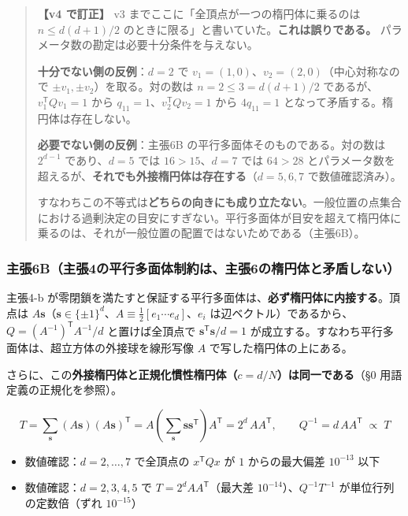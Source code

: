 \documentclass[
  10pt,
]{ltjsarticle}
\providecommand{\tightlist}{%
  \setlength{\itemsep}{0pt}\setlength{\parskip}{0pt}}
\begin{document}
\begin{quote}
\textbf{【v4 で訂正】} v3 までここに「全頂点が一つの楕円体に乗るのは
\(n \le d(d+1)/2\)
のときに限る」と書いていた。\textbf{これは誤りである。}
パラメータ数の勘定は必要十分条件を与えない。

\textbf{十分でない側の反例}：\(d=2\) で
\(v_1=(1,0)\)、\(v_2=(2,0)\)（中心対称なので
\(\pm v_1, \pm v_2\)）を取る。対の数は \(n=2 \le 3 = d(d+1)/2\)
であるが、\(v_1^{\mathsf T}Qv_1 = 1\) から
\(q_{11}=1\)、\(v_2^{\mathsf T}Qv_2 = 1\) から \(4q_{11}=1\)
となって矛盾する。楕円体は存在しない。

\textbf{必要でない側の反例}：主張6B の平行多面体そのものである。対の数は
\(2^{d-1}\) であり、\(d=5\) では \(16 > 15\)、\(d=7\) では \(64 > 28\)
とパラメータ数を超えるが、\textbf{それでも外接楕円体は存在する}（\(d=5,6,7\)
で数値確認済み）。

すなわちこの不等式は\textbf{どちらの向きにも成り立たない}。一般位置の点集合における過剰決定の目安にすぎない。平行多面体が目安を超えて楕円体に乗るのは、それが一般位置の配置ではないためである（主張6B）。
\end{quote}

\subsubsection{主張6B（主張4の平行多面体制約は、主張6の楕円体と矛盾しない）}\label{ux4e3bux5f356bux4e3bux5f354ux306eux5e73ux884cux591aux9762ux4f53ux5236ux7d04ux306fux4e3bux5f356ux306eux6955ux5186ux4f53ux3068ux77dbux76feux3057ux306aux3044}

主張4-b
が零閉鎖を満たすと保証する平行多面体は、\textbf{必ず楕円体に内接する}。頂点は
\(A\mathbf{s}\)（\(\mathbf{s}\in\{\pm1\}^d\)、\textbf{\(A \equiv \tfrac12[e_1\cdots e_d]\)}、\(e_i\)
は辺ベクトル）であるから、\(Q = (A^{-1})^{\mathsf T}A^{-1}/d\)
と置けば全頂点で \(\mathbf{s}^{\mathsf T}\mathbf{s}/d = 1\)
が成立する。すなわち平行多面体は、超立方体の外接球を線形写像 \(A\)
で写した楕円体の上にある。

さらに、この\textbf{外接楕円体と正規化慣性楕円体（\(c = d/N\)）は同一である}（§0
用語定義の正規化を参照）。

\[T = \sum_{\mathbf{s}} (A\mathbf{s})(A\mathbf{s})^{\mathsf T} = A\left(\sum_{\mathbf{s}}\mathbf{s}\mathbf{s}^{\mathsf T}\right)A^{\mathsf T} = 2^{d}\,AA^{\mathsf T}, \qquad Q^{-1} = d\,AA^{\mathsf T} \;\propto\; T\]

\begin{itemize}
\tightlist
\item
  数値確認：\(d=2,\dots,7\) で全頂点の \(x^{\mathsf T}Qx\) が \(1\)
  からの最大偏差 \(10^{-13}\) 以下
\item
  数値確認：\(d=2,3,4,5\) で \(T = 2^d AA^{\mathsf T}\)（最大差
  \(10^{-14}\)）、\(Q^{-1}T^{-1}\) が単位行列の定数倍（ずれ
  \(10^{-15}\)）
\end{itemize}
\end{document}
